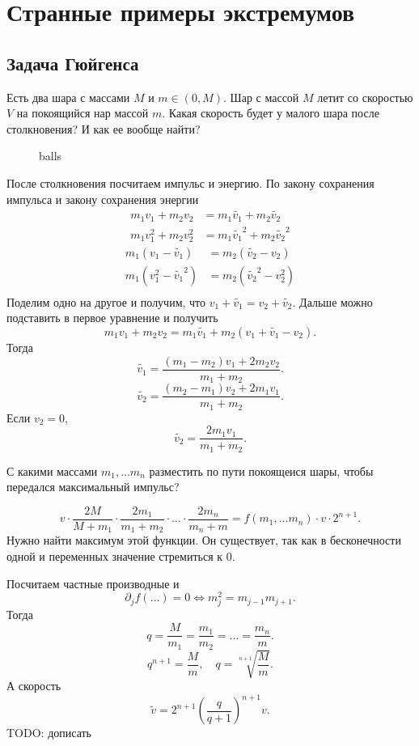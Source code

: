 % 
% 

\section{Странные примеры экстремумов}
\subsection{Задача Гюйгенса}
\begin{desc}
    Есть два шара с массами $ M$ и $ m \in (0, M)$. Шар с массой $ M$ летит со скоростью  $ V$ на покоящийся нар массой  $ m$. Какая скорость будет у малого шара после столкновения? И как ее вообще найти?
\end{desc}
\begin{figure}[ht]
    \centering
    \caption{balls}
    \label{fig:balls}
\end{figure}
После столкновения посчитаем импульс и энергию.
По закону сохранения импульса и закону сохранения энергии
\begin{align*}
    m_1v_1 + m_2v_2 &= m_1 \widetilde{ v_1} + m_2 \widetilde{ v_2} \\
m_1v_1^2 + m_2v_2^2 &= m_1 \widetilde{ v_1}^2 + m_2 \widetilde{ v_2}^2 
\end{align*}
\begin{align*}
    m_1(v_1-\widetilde{ v_1} ) &= m_2(\widetilde{ v_2} -v_2)\\
    m_1(v_1^2-\widetilde{ v_1}^2 ) &= m_2(\widetilde{ v_2}^2 -v_2^2)\\
\end{align*}
Поделим одно на другое и получим, что $ v_1+\widetilde{ v_1} = v_2+\widetilde{ v_2}  $.
Дальше можно подставить в первое уравнение и получить
\[
    m_1v_1+ m_2v_2 =m_1 \widetilde{ v_1} +m_2(v_1+ \widetilde{ v_1} -v_2)
.\] 
Тогда
\[
    \widetilde{ v_1}= \frac{(m_1-m_2)v_1 +2m_2v_2}{m_1+m_2}
.\] 
\[
    \widetilde{ v_2}= \frac{(m_2-m_1)v_2 +2m_1v_1}{m_1+m_2}
.\] 
Если $ v_2=0$, 
\[
    \widetilde{ v_2} = \frac{2m_1v_1}{m_1+m_2} 
.\] 
\begin{defn}
    С какими массами $ m_1, \ldots m_n$ разместить по пути покоящеися шары, чтобы передался максимальный импульс?
\end{defn}
\[
    v \cdot  \frac{2M}{M+m_1} \cdot  \frac{2m_1}{m_1+m_2} \cdot \ldots \cdot \frac{2m_n}{m_n +m} = f(m_1, \ldots m_n) \cdot v \cdot 2^{n+1}
.\] 
Нужно найти максимум этой функции. Он существует, так как в бесконечности  одной и переменных значение стремиться к 0.

Посчитаем частные производные и 
\[
    \partial _j f(\ldots ) = 0 \Longleftrightarrow  m_j^2=m_{j-1}m_{j+1}
.\] 
Тогда 
\[
q =     \frac{M}{m_1}= \frac{m_1}{m_2} = \ldots = \frac{m_n}{m}
.\] 
 \[
     q^{n+1} = \frac{M}{m}, \quad q = \sqrt[n+1]{\frac{M}{m}}
 .\] 
 А скорость
 \[
     \widetilde{ v} = 2^{n+1} \left( \frac{q}{q+1} \right) ^{n+1} v
 .\] 
 TODO: дописать
% 
